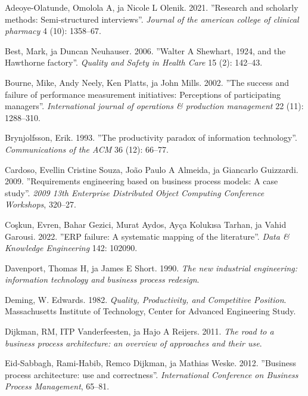 \documentclass[
  finnish,
  letterpaper,
  DIV=11,
  numbers=noendperiod,
  oneside]{scrreprt}
\newlength{\cslhangindent}
\newenvironment{CSLReferences}[2] %
 {\begin{list}{}{%
  \setlength{\itemindent}{0pt}
  \setlength{\leftmargin}{0pt}
  \setlength{\parsep}{0pt}
  \ifodd #1
   \setlength{\leftmargin}{\cslhangindent}
   \setlength{\itemindent}{-1\cslhangindent}
  \fi
  \setlength{\itemsep}{#2\baselineskip}}}
 {\end{list}}
\begin{document}
\protect{}\label{refs}
\begin{CSLReferences}{1}{1}
Adeoye-Olatunde, Omolola A, ja Nicole L Olenik. 2021. {''Research and
scholarly methods: Semi-structured interviews''}. \emph{Journal of the
american college of clinical pharmacy} 4 (10): 1358--67.

Best, Mark, ja Duncan Neuhauser. 2006. {''Walter A Shewhart, 1924, and
the Hawthorne factory''}. \emph{Quality and Safety in Health Care} 15
(2): 142--43.

Bourne, Mike, Andy Neely, Ken Platts, ja John Mills. 2002. {''The
success and failure of performance measurement initiatives: Perceptions
of participating managers''}. \emph{International journal of operations
\& production management} 22 (11): 1288--310.

Brynjolfsson, Erik. 1993. {''The productivity paradox of information
technology''}. \emph{Communications of the ACM} 36 (12): 66--77.

Cardoso, Evellin Cristine Souza, João Paulo A Almeida, ja Giancarlo
Guizzardi. 2009. {''Requirements engineering based on business process
models: A case study''}. \emph{2009 13th Enterprise Distributed Object
Computing Conference Workshops}, 320--27.

Coşkun, Evren, Bahar Gezici, Murat Aydos, Ayça Kolukısa Tarhan, ja Vahid
Garousi. 2022. {''ERP failure: A systematic mapping of the
literature''}. \emph{Data \& Knowledge Engineering} 142: 102090.

Davenport, Thomas H, ja James E Short. 1990. \emph{The new industrial
engineering: information technology and business process redesign}.

Deming, W. Edwards. 1982. \emph{Quality, Productivity, and Competitive
Position}. Massachusetts Institute of Technology, Center for Advanced
Engineering Study.

Dijkman, RM, ITP Vanderfeesten, ja Hajo A Reijers. 2011. \emph{The road
to a business process architecture: an overview of approaches and their
use}.

Eid-Sabbagh, Rami-Habib, Remco Dijkman, ja Mathias Weske. 2012.
{''Business process architecture: use and correctness''}.
\emph{International Conference on Business Process Management}, 65--81.


\end{CSLReferences}
\end{document}
